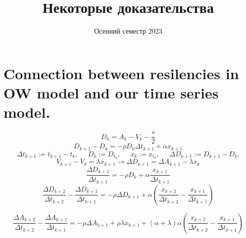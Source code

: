 \documentclass[a4paper]{article}
\date{Осенний семестр 2023}
\title{Некоторые доказательства}
\theoremstyle{definition}
\begin{document}
    \section{Connection between resilencies in OW model and our time series model.}

    \[ D_k = A_k - V_k - \frac{s}{2} \]
    \[ D_{k+1} - D_k = -\rho D_k \Delta t_{k+1} + \alpha x_{k+1} \]
    \[ \Delta t_{k+1} := t_{k+1} - t_k, \; \; \; \; \; D_k := D_{t_k}, \; \; \; \; \; x_{k}:= x_{t_k}, \; \; \; \; \; \Delta D_{k+1} := D_{k+1} - D_k . \]
    \[ V_{k+1} - V_k = \lambda x_{k+1} \rightarrow \Delta D_{k+1} = \Delta A_{k+1} - \lambda x_k \] 
    \[ \frac{\Delta D_{k+1}}{\Delta t_{k+1}} = - \rho D_k + \alpha \frac{x_{k+1}}{\Delta t_{k+1}} \] 
    \[ \frac{\Delta D_{k+2}}{\Delta t_{k+2}} - \frac{\Delta D_{k+1}}{\Delta t_{k+1}} 
        = - \rho \Delta D_{k+1} + \alpha ( \frac{x_{k+2}}{\Delta t_{k+2}} - \frac{x_{k+1}}{\Delta t_{k+1}}) \] 
    
    \[ \frac{\Delta A_{k+2}}{\Delta t_{k+2}} - \frac{\Delta A_{k+1}}{\Delta t_{k+1}} 
        = - \rho \Delta A_{k+1} + \rho \lambda x_{k+1} + (\alpha + \lambda)\alpha (\frac{x_{k+2}}{\Delta t_{k+2}} - \frac{x_{k+1}}{\Delta t_{k+1}}) \] 
\end{document}
